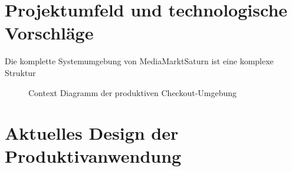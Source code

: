 \section{Projektumfeld und technologische Vorschläge}

Die komplette Systemumgebung von MediaMarktSaturn ist eine komplexe Struktur 


\begin{figure}[htbp]
	\centering
	
	\caption{Context Diagramm der produktiven Checkout-Umgebung}
	\label{fig:ContextDiagramm}
\end{figure}

\blindtext


\section{Aktuelles Design der Produktivanwendung}
\blindtext
